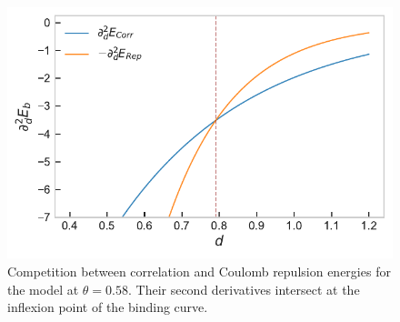 \documentclass[reprint, amsmath, amssymb, floatfix, aps, pra]{revtex4-2}
\begin{document}
    \begin{figure}
        \includegraphics[scale=0.75]{figures/repulsion_vs_correlation_2nd_derivative.pdf}
        \caption{\label{fig:second_derivatives}Competition between correlation and Coulomb repulsion energies for the model at $\theta=0.58$. Their second derivatives intersect at the inflexion point of the binding curve.}
    \end{figure}
\end{document}
